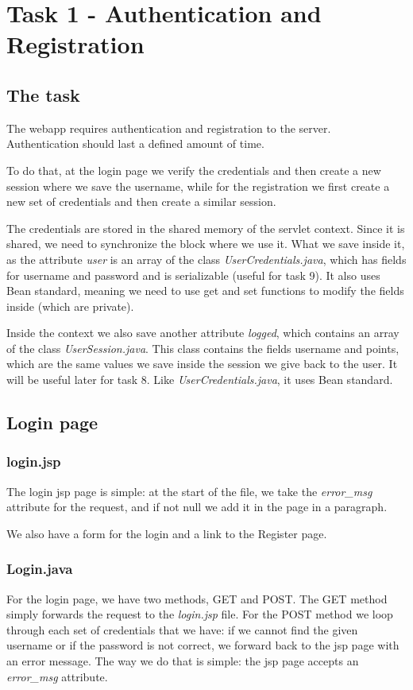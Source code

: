 \section{Task 1 - Authentication and Registration}
\subsection{The task}
The webapp requires authentication and registration to the server. Authentication should last a defined amount of time.

To do that, at the login page we verify the credentials and then create a new session where we save the username, while for the registration we first create a new set of credentials and then create a similar session.

The credentials are stored in the shared memory of the servlet context. Since it is shared, we need to synchronize the block where we use it. What we save inside it, as the attribute \textit{user} is an array of the class \textit{UserCredentials.java}, which has fields for username and password and is serializable (useful for task 9). It also uses Bean standard, meaning we need to use get and set functions to modify the fields inside (which are private).

Inside the context we also save another attribute \textit{logged}, which contains an array of the class \textit{UserSession.java}. This class contains the fields username and points, which are the same values we save inside the session we give back to the user. It will be useful later for task 8. Like \textit{UserCredentials.java}, it uses Bean standard.
\subsection{Login page}
\subsubsection{login.jsp}
The login jsp page is simple: at the start of the file, we take the \textit{error\_msg} attribute for the request, and if not null we add it in the page in a paragraph.

We also have a form for the login and a link to the Register page.
\subsubsection{Login.java}
For the login page, we have two methods, GET and POST. The GET method simply forwards the request to the \textit{login.jsp} file. For the POST method we loop through each set of credentials that we have: if we cannot find the given username or if the password is not correct, we forward back to the jsp page with an error message. The way we do that is simple: the jsp page accepts an \textit{error\_msg} attribute.

